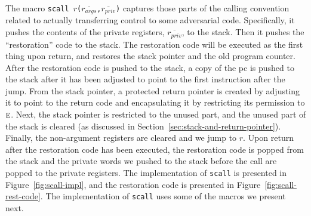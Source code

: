 \documentclass[format=acmsmall, review=true, screen=true]{acmart}
\renewcommand{\figurename}{Figure}
\newcommand{\var}[1]{\mathit{#1}}
\newcommand{\plainperm}[1]{\textsc{#1}}
\newcommand{\entry}{\plainperm{e}}
\newenvironment{toplas}{}{}
\begin{document}
\begin{toplas}
The macro \texttt{scall
    $r$($\overline{r_{\var{args}}}$,$\overline{r_{\var{priv}}}$)} captures
those parts of the calling convention related to actually transferring control
to some adversarial code. Specifically, it pushes the contents of the private
registers, $\overline{r_{\var{priv}}}$, to the stack. Then it pushes the
``restoration'' code to the stack. The restoration code will be executed as the
first thing upon return, and restores the stack pointer and the old program
counter. After the restoration code is pushed to the stack, a copy of the pc is
pushed to the stack after it has been adjusted to point to the first instruction
after the jump. From the stack pointer, a protected return pointer is created by
adjusting it to point to the return code and encapsulating it by restricting its
permission to $\entry$. Next, the stack pointer is restricted to the unused
part, and the unused part of the stack is cleared (as discussed in
Section~\ref{sec:stack-and-return-pointer}). Finally, the non-argument registers
are cleared and we jump to $r$. Upon return after the restoration code has been
executed, the restoration code is popped from the stack and the private words we
pushed to the stack before the call are popped to the private registers. The
implementation of \texttt{scall} is presented in
\figurename~\ref{fig:scall-impl}, and the restoration code is presented in
\figurename~\ref{fig:scall-rest-code}. The implementation of \texttt{scall} uses
some of the macros we present next.


\end{toplas}
\end{document}
